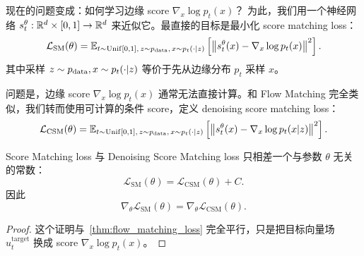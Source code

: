 现在的问题变成：如何学习边缘 score
\(
\nabla_x \log p_t(x)
\)？
为此，我们用一个神经网络
\(
s_t^\theta:\mathbb{R}^d\times[0,1]\to\mathbb{R}^d
\)
来近似它。最直接的目标是最小化 score matching loss：
\begin{equation}
\mathcal{L}_{\mathrm{SM}}(\theta)
=
\mathbb{E}_{t\sim \mathrm{Unif}[0,1],\,z\sim p_{\mathrm{data}},\,x\sim p_t(\cdot|z)}
\left[
\left\|
s_t^\theta(x)-\nabla_x\log p_t(x)
\right\|^2
\right].
\end{equation}
其中采样 $z\sim p_{\mathrm{data}},x\sim p_t(\cdot|z)$ 等价于先从边缘分布
$p_t$ 采样 $x$。

问题是，边缘 score
\(
\nabla_x\log p_t(x)
\)
通常无法直接计算。和 Flow Matching 完全类似，我们转而使用可计算的条件
score，定义 denoising score matching loss：
\begin{equation}
\mathcal{L}_{\mathrm{CSM}}(\theta)
=
\mathbb{E}_{t\sim \mathrm{Unif}[0,1],\,z\sim p_{\mathrm{data}},\,x\sim p_t(\cdot|z)}
\left[
\left\|
s_t^\theta(x)-\nabla_x\log p_t(x|z)
\right\|^2
\right].
\end{equation}

\begin{theorem}
Score Matching loss 与 Denoising Score Matching loss 只相差一个与参数 $\theta$ 无关的常数：
\begin{equation}
\mathcal{L}_{\mathrm{SM}}(\theta)
=
\mathcal{L}_{\mathrm{CSM}}(\theta)+C.
\end{equation}
因此
\begin{equation}
\nabla_\theta \mathcal{L}_{\mathrm{SM}}(\theta)
=
\nabla_\theta \mathcal{L}_{\mathrm{CSM}}(\theta).
\end{equation}
\end{theorem}

\begin{proof}
这个证明与~\ref{thm:flow_matching_loss} 完全平行，只是把目标向量场
$u_t^{\mathrm{target}}$ 换成 score $\nabla_x\log p_t(x)$。
\end{proof}

